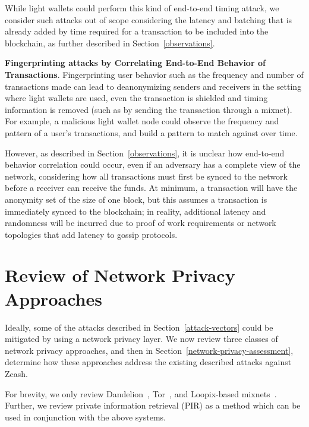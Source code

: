 \documentclass{article}
\newcounter{mn}
\begin{document}
While light wallets could perform this kind of end-to-end timing attack, we
consider such attacks out of scope considering the latency and batching that is
already added by time required for a transaction to be included into the
blockchain, as further described in Section~\ref{observations}.

\textbf{Fingerprinting attacks by Correlating End-to-End Behavior of Transactions}.
Fingerprinting user behavior such as the frequency and number of transactions
made can lead to deanonymizing senders and receivers in the setting where light
wallets are used, even the transaction is shielded and timing information is
removed (such as by sending the transaction through a mixnet).
For example, a malicious light wallet node could observe
the frequency and pattern of a user’s transactions, and build a pattern to
match against over time.

However, as described in Section~\ref{observations}, it is unclear how
end-to-end behavior correlation could occur, even if an adversary has a
complete view of the network, considering how all transactions must first be
synced to the network before a receiver can receive the funds. At minimum, a
transaction will have the anonymity set of the size of one block, but this
assumes a transaction is immediately synced to the blockchain; in reality,
additional latency and randomness will be incurred due to proof of work
requirements or network topologies that add latency to gossip protocols.


\section{Review of Network Privacy Approaches}
\label{network-privacy-review}

Ideally, some of the attacks described in Section~\ref{attack-vectors} could be
mitigated by using a network privacy layer. We now review three
classes of network privacy approaches, and then in
Section~\ref{network-privacy-assessment}, determine how these approaches
address the existing described attacks against Zcash.

For brevity, we only review
Dandelion~\cite{Fanti:2018:DLC,BojjaVenkatakrishnan:2017:DRB},
Tor~\cite{tor-specification}, and
Loopix-based mixnets~\cite{Piotrowska:2017:LAS}.
Further, we review private information retrieval (PIR) as a method which can be
used in conjunction with the above systems.
\end{document}

